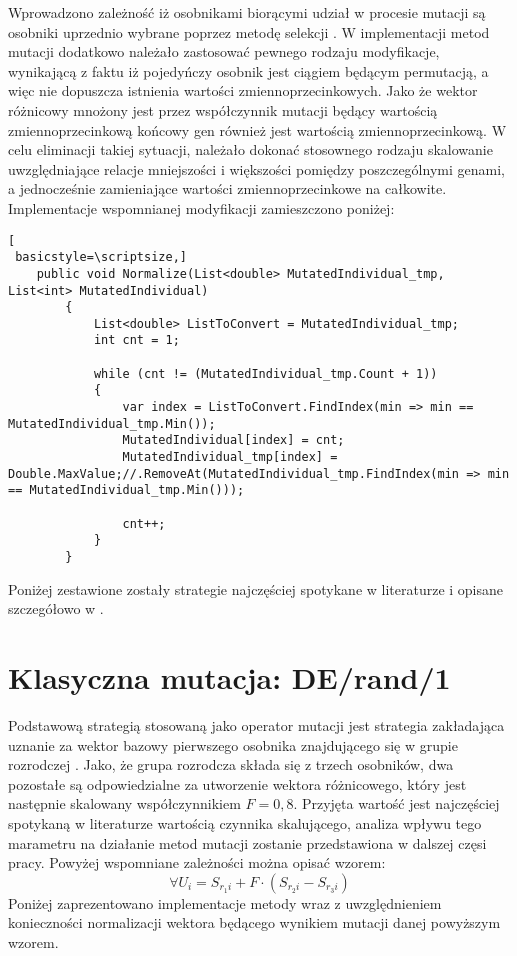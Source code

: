 Wprowadzono zależność iż osobnikami biorącymi udział w procesie mutacji są osobniki uprzednio wybrane poprzez metodę selekcji \cite{diff2}. W implementacji metod mutacji dodatkowo należało zastosować pewnego rodzaju modyfikacje, wynikającą z faktu iż pojedyńczy osobnik jest ciągiem będącym permutacją, a więc nie dopuszcza istnienia wartości zmiennoprzecinkowych. Jako że wektor różnicowy mnożony jest przez współczynnik mutacji będący wartością zmiennoprzecinkową końcowy gen również jest wartością zmiennoprzecinkową. W celu eliminacji takiej sytuacji, należało dokonać stosownego rodzaju skalowanie uwzględniające relacje mniejszości i większości pomiędzy poszczególnymi genami, a jednocześnie zamieniające wartości zmiennoprzecinkowe na całkowite. Implementacje wspomnianej modyfikacji zamieszczono poniżej:

\begin{program}[h!]
\begin{lstlisting}[
 basicstyle=\scriptsize,]
	public void Normalize(List<double> MutatedIndividual_tmp, List<int> MutatedIndividual)
        {
            List<double> ListToConvert = MutatedIndividual_tmp;
            int cnt = 1;

            while (cnt != (MutatedIndividual_tmp.Count + 1))
            {
                var index = ListToConvert.FindIndex(min => min == MutatedIndividual_tmp.Min());
                MutatedIndividual[index] = cnt;
                MutatedIndividual_tmp[index] = Double.MaxValue;//.RemoveAt(MutatedIndividual_tmp.FindIndex(min => min == MutatedIndividual_tmp.Min()));

                cnt++;
            }
        }
\end{lstlisting}
\end{program}

 Poniżej zestawione zostały strategie najczęściej spotykane w literaturze i opisane szczegółowo w \cite{doktorat}.

\section{Klasyczna mutacja: DE/rand/1}\label{sec:strukturaDokumentu}

Podstawową strategią  stosowaną jako operator mutacji jest strategia zakładająca uznanie za wektor bazowy pierwszego osobnika znajdującego się w grupie rozrodczej \cite{diff2}. Jako, że grupa rozrodcza składa się z trzech osobników, dwa pozostałe są odpowiedzialne za utworzenie wektora różnicowego, który jest następnie skalowany współczynnikiem $F = 0,8$. Przyjęta wartość jest najczęściej spotykaną w literaturze wartością czynnika skalującego, analiza wpływu tego marametru na działanie metod mutacji zostanie przedstawiona w dalszej częsi pracy. Powyżej wspomniane zależności można opisać wzorem:
$$
 \forall U_{i} =S_{r_{1}i} + F \cdot (S_{r_{2}i} - S_{r_{3}i})
$$
Poniżej zaprezentowano implementacje metody wraz z uwzględnieniem konieczności normalizacji wektora będącego wynikiem mutacji danej powyższym wzorem. 

